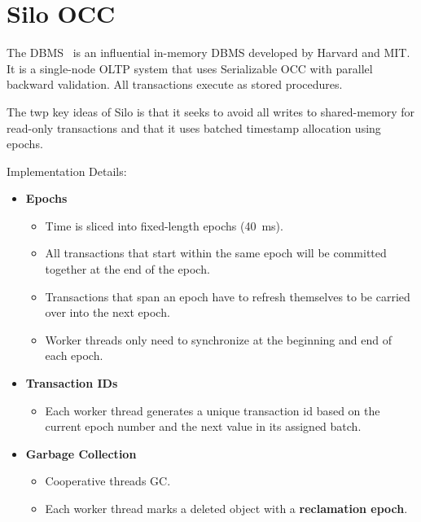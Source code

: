 \documentclass[11pt]{article}
\begin{document}
\section{Silo OCC}
The  DBMS~\cite{tu-sosp2013,silo} is an influential in-memory DBMS developed by Harvard 
and MIT. It is a single-node OLTP system that uses Serializable OCC with parallel backward 
validation. All transactions execute as stored procedures.

The twp key ideas of Silo is that it seeks to avoid all writes to shared-memory for read-only 
transactions and that it uses batched timestamp allocation using epochs.

Implementation Details:
\begin{itemize}
    \item \textbf{Epochs}
    \begin{itemize}
        \item
        Time is sliced into fixed-length epochs (40~ms).
        
        \item
        All transactions that start within the same epoch will be committed together at the end of 
        the epoch.
        
        \item
        Transactions that span an epoch have to refresh themselves to be carried over into the next 
        epoch.
        
        \item
        Worker threads only need to synchronize at the beginning and end of each epoch.
    \end{itemize}
    
    \item \textbf{Transaction IDs}
    \begin{itemize}
        \item
        Each worker thread generates a unique transaction id based on the current epoch number and 
        the next value in its assigned batch.
    \end{itemize}
    
    \item \textbf{Garbage Collection}
    \begin{itemize}
        \item
        Cooperative threads GC.
        
        \item
        Each worker thread marks a deleted object with a \textbf{reclamation epoch}.
    \end{itemize}
    

\end{itemize}
\end{document}
